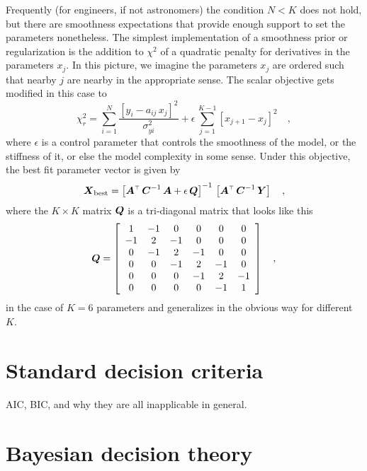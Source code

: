 \documentclass[12pt,twoside]{article}
\begin{document}
Frequently (for engineers, if not astronomers) the condition $N<K$
does not hold, but there are smoothness expectations that provide
enough support to set the parameters nonetheless.  The simplest
implementation of a smoothness prior or regularization is the addition
to $\chi^2$ of a quadratic penalty for derivatives in the parameters
$x_j$.  In this picture, we imagine the parameters $x_j$ are ordered
such that nearby $j$ are nearby in the appropriate sense.  The scalar
objective gets modified in this case to
\begin{equation}
\chi_r^2 = \sum_{i=1}^N
  \frac{\left[y_i - a_{ij}\,x_j\right]^2}{\sigma_{yi}^2}
  + \epsilon\,\sum_{j=1}^{K-1}\left[x_{j+1}-x_j\right]^2
  \quad ,
\end{equation}
where $\epsilon$ is a control parameter that controls the smoothness
of the model, or the stiffness of it, or else the model complexity in
some sense.  Under this objective, the best fit parameter vector is
given by
\begin{equation}
\boldsymbol{X}_{\mathrm{best}} = {\left[{\boldsymbol{A}}^{\scriptscriptstyle \top}\,{\boldsymbol{C}}^{-1}\,\boldsymbol{A} + \epsilon\,\boldsymbol{Q}\right]}^{-1}
  \,\left[{\boldsymbol{A}}^{\scriptscriptstyle \top}\,{\boldsymbol{C}}^{-1}\,\boldsymbol{Y}\right]
  \quad ,
\end{equation}
where the $K\times K$ matrix $\boldsymbol{Q}$ is a tri-diagonal matrix that looks
like this
\begin{equation}
\boldsymbol{Q} = \left[\begin{array}{cccccc}
    1 &-1 & 0 & 0 & 0 & 0 \\
   -1 & 2 &-1 & 0 & 0 & 0 \\
    0 &-1 & 2 &-1 & 0 & 0 \\
    0 & 0 &-1 & 2 &-1 & 0 \\
    0 & 0 & 0 &-1 & 2 &-1 \\
    0 & 0 & 0 & 0 &-1 & 1 \\
  \end{array}\right]
  \quad ,
\end{equation}
in the case of $K=6$ parameters and generalizes in the obvious way for
different $K$.

\section{Standard decision criteria}

AIC, BIC, and why they are all inapplicable in general.

\section{Bayesian decision theory}
\end{document}
